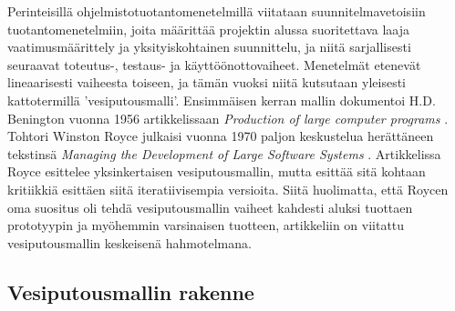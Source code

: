 \documentclass[finnish,12pt]{tktltiki2}
\theoremstyle{definition}
\theoremstyle{remark}
\begin{document}
Perinteisillä ohjelmistotuotantomenetelmillä viitataan suunnitelmavetoisiin tuotantomenetelmiin, joita määrittää projektin alussa suoritettava laaja vaatimusmäärittely ja yksityiskohtainen suunnittelu, ja niitä sarjallisesti seuraavat toteutus-, testaus- ja käyttöönottovaiheet. Menetelmät etenevät lineaarisesti vaiheesta toiseen, ja tämän vuoksi niitä kutsutaan yleisesti kattotermillä 'vesiputousmalli'. Ensimmäisen kerran mallin dokumentoi H.D. Benington vuonna 1956 artikkelissaan \textit{Production of large computer programs} \cite{Benington:1987:PLC:41765.41799}. \cite{Ruparelia:2010:SDL:1764810.1764814} Tohtori Winston Royce julkaisi vuonna 1970 paljon keskustelua herättäneen tekstinsä \textit{Managing the Development of Large Software Systems} \cite{Royce1970}. Artikkelissa Royce esittelee yksinkertaisen vesiputousmallin, mutta esittää sitä kohtaan kritiikkiä esittäen siitä iteratiivisempia versioita. Siitä huolimatta, että Roycen oma suositus oli tehdä vesiputousmallin vaiheet kahdesti aluksi tuottaen prototyypin ja myöhemmin varsinaisen tuotteen, artikkeliin on viitattu vesiputousmallin keskeisenä hahmotelmana.

\subsection{Vesiputousmallin rakenne}
\end{document}
